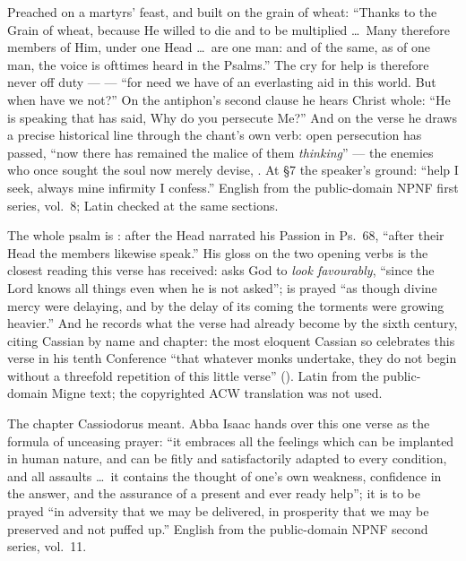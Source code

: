 \begin{witnessnote}
Preached on a martyrs' feast, and built on the grain of wheat: ``Thanks to the
Grain of wheat, because He willed to die and to be multiplied \dots\ Many
therefore members of Him, under one Head \dots\ are one man: and of the same,
as of one man, the voice is ofttimes heard in the Psalms.'' The cry for help
is therefore never off duty ---  --- ``for need we have of an everlasting aid in this world.
But when have we not?'' On the antiphon's second clause he hears Christ
whole: ``He is speaking that has said, Why do you persecute Me?'' And on the
verse he draws a precise historical line through the chant's own verb: open
persecution has passed, ``now there has remained the malice of them
\textit{thinking}'' --- the enemies who once sought the soul now merely devise,
. At §7 the speaker's ground: ``help I seek, always mine
infirmity I confess.'' English from the public-domain NPNF first series,
vol.~8; Latin checked at the same sections.
\end{witnessnote}

\begin{witnessnote}
The whole psalm is : after the Head narrated his
Passion in Ps.~68, ``after their Head the members likewise speak.'' His gloss
on the two opening verbs is the closest reading this verse has received:
 asks God to \textit{look favourably}, ``since the Lord knows
all things even when he is not asked'';  is prayed ``as though
divine mercy were delaying, and by the delay of its coming the torments were
growing heavier.'' And he records what the verse had already become by the
sixth century, citing Cassian by name and chapter: the most eloquent Cassian
so celebrates this verse in his tenth Conference ``that whatever monks
undertake, they do not begin without a threefold repetition of this little
verse'' (). Latin
from the public-domain Migne text; the copyrighted ACW translation was not
used.
\end{witnessnote}

\begin{witnessnote}
The chapter Cassiodorus meant. Abba Isaac hands over this one verse as the
formula of unceasing prayer: ``it embraces all the feelings which can be
implanted in human nature, and can be fitly and satisfactorily adapted to
every condition, and all assaults \dots\ it contains the thought of one's own
weakness, confidence in the answer, and the assurance of a present and ever
ready help''; it is to be prayed ``in adversity that we may be delivered, in
prosperity that we may be preserved and not puffed up.'' English from the
public-domain NPNF second series, vol.~11.
\end{witnessnote}


